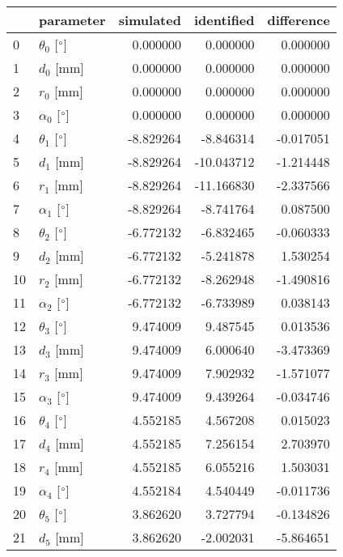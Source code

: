 \documentclass{standalone}%
\begin{document}
%
\normalsize%
\begin{tabular}{llrrr}
\toprule
{} &                 parameter & simulated & identified & difference \\
\midrule
0  &  $\theta_{0}$ [$\degree$] &  0.000000 &   0.000000 &   0.000000 \\
1  &              $d_{0}$ [mm] &  0.000000 &   0.000000 &   0.000000 \\
2  &              $r_{0}$ [mm] &  0.000000 &   0.000000 &   0.000000 \\
3  &  $\alpha_{0}$ [$\degree$] &  0.000000 &   0.000000 &   0.000000 \\
4  &  $\theta_{1}$ [$\degree$] & -8.829264 &  -8.846314 &  -0.017051 \\
5  &              $d_{1}$ [mm] & -8.829264 & -10.043712 &  -1.214448 \\
6  &              $r_{1}$ [mm] & -8.829264 & -11.166830 &  -2.337566 \\
7  &  $\alpha_{1}$ [$\degree$] & -8.829264 &  -8.741764 &   0.087500 \\
8  &  $\theta_{2}$ [$\degree$] & -6.772132 &  -6.832465 &  -0.060333 \\
9  &              $d_{2}$ [mm] & -6.772132 &  -5.241878 &   1.530254 \\
10 &              $r_{2}$ [mm] & -6.772132 &  -8.262948 &  -1.490816 \\
11 &  $\alpha_{2}$ [$\degree$] & -6.772132 &  -6.733989 &   0.038143 \\
12 &  $\theta_{3}$ [$\degree$] &  9.474009 &   9.487545 &   0.013536 \\
13 &              $d_{3}$ [mm] &  9.474009 &   6.000640 &  -3.473369 \\
14 &              $r_{3}$ [mm] &  9.474009 &   7.902932 &  -1.571077 \\
15 &  $\alpha_{3}$ [$\degree$] &  9.474009 &   9.439264 &  -0.034746 \\
16 &  $\theta_{4}$ [$\degree$] &  4.552185 &   4.567208 &   0.015023 \\
17 &              $d_{4}$ [mm] &  4.552185 &   7.256154 &   2.703970 \\
18 &              $r_{4}$ [mm] &  4.552185 &   6.055216 &   1.503031 \\
19 &  $\alpha_{4}$ [$\degree$] &  4.552184 &   4.540449 &  -0.011736 \\
20 &  $\theta_{5}$ [$\degree$] &  3.862620 &   3.727794 &  -0.134826 \\
21 &              $d_{5}$ [mm] &  3.862620 &  -2.002031 &  -5.864651 \\

\end{tabular}
\end{document}
